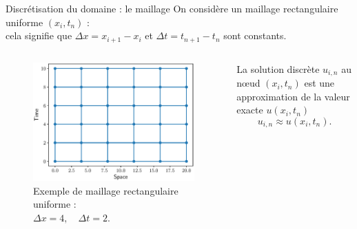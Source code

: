 \documentclass[aspectratio=169, french]{beamer}
\begin{document}
\begin{frame}{Discrétisation du domaine : le maillage}
On considère un maillage rectangulaire uniforme $(x_i, t_n)$ : \\
cela signifie que $\Delta x = x_{i+1}- x_i $ et $\Delta t = t_{n+1}- t_n$ sont constants. \\
  

	\begin{columns}
	\begin{column}{.5\textwidth}
	\begin{figure}
		\includegraphics[height=.5\textheight]{mesh.eps}
		\caption*{Exemple de maillage rectangulaire uniforme :\\ $\Delta x = 4, \quad \Delta t=2$.}
	\end{figure}	
	\end{column}
	\begin{column}{.5\textwidth}
		\begin{tcolorbox}
			La solution discrète $u_{i, n}$ au n\oe{}ud $(x_i, t_n)$ est une approximation  de la valeur exacte $u(x_i, t_n)$
			\begin{equation*}
				u_{i, n} \approx u(x_i, t_n).
			\end{equation*} 
		\end{tcolorbox}
	\end{column}
\end{columns}	

\end{frame}
\end{document}
